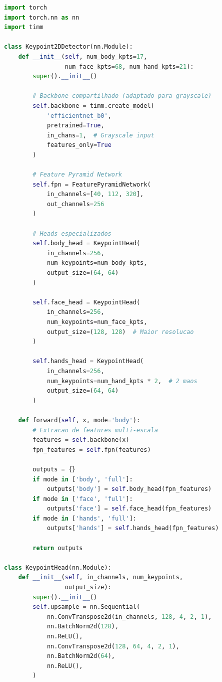 \documentclass[12pt, a4paper]{article}
\begin{document}
\begin{lstlisting}[language=Python, caption=Módulo 2 - Detecção 2D]
import torch
import torch.nn as nn
import timm

class Keypoint2DDetector(nn.Module):
    def __init__(self, num_body_kpts=17, 
                 num_face_kpts=68, num_hand_kpts=21):
        super().__init__()
        
        # Backbone compartilhado (adaptado para grayscale)
        self.backbone = timm.create_model(
            'efficientnet_b0', 
            pretrained=True,
            in_chans=1,  # Grayscale input
            features_only=True
        )
        
        # Feature Pyramid Network
        self.fpn = FeaturePyramidNetwork(
            in_channels=[40, 112, 320],
            out_channels=256
        )
        
        # Heads especializados
        self.body_head = KeypointHead(
            in_channels=256, 
            num_keypoints=num_body_kpts,
            output_size=(64, 64)
        )
        
        self.face_head = KeypointHead(
            in_channels=256,
            num_keypoints=num_face_kpts,
            output_size=(128, 128)  # Maior resolucao
        )
        
        self.hands_head = KeypointHead(
            in_channels=256,
            num_keypoints=num_hand_kpts * 2,  # 2 maos
            output_size=(64, 64)
        )
    
    def forward(self, x, mode='body'):
        # Extracao de features multi-escala
        features = self.backbone(x)
        fpn_features = self.fpn(features)
        
        outputs = {}
        if mode in ['body', 'full']:
            outputs['body'] = self.body_head(fpn_features)
        if mode in ['face', 'full']:
            outputs['face'] = self.face_head(fpn_features)
        if mode in ['hands', 'full']:
            outputs['hands'] = self.hands_head(fpn_features)
        
        return outputs

class KeypointHead(nn.Module):
    def __init__(self, in_channels, num_keypoints, 
                 output_size):
        super().__init__()
        self.upsample = nn.Sequential(
            nn.ConvTranspose2d(in_channels, 128, 4, 2, 1),
            nn.BatchNorm2d(128),
            nn.ReLU(),
            nn.ConvTranspose2d(128, 64, 4, 2, 1),
            nn.BatchNorm2d(64),
            nn.ReLU(),
        )
        

\end{lstlisting}
\end{document}
